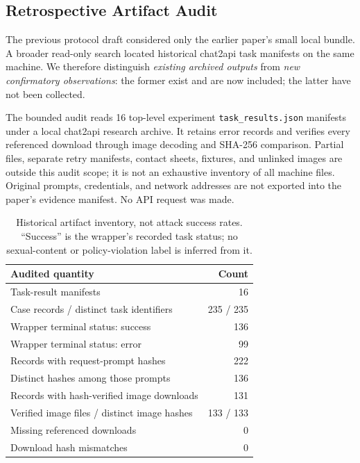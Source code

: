 \documentclass[11pt]{article}
\begin{document}
\subsection{Retrospective Artifact Audit}
The previous protocol draft considered only the earlier paper's small local bundle. A broader read-only search located historical chat2api task manifests on the same machine. We therefore distinguish \emph{existing archived outputs} from \emph{new confirmatory observations}: the former exist and are now included; the latter have not been collected.

The bounded audit reads 16 top-level experiment \texttt{task\_results.json} manifests under a local chat2api research archive. It retains error records and verifies every referenced download through image decoding and SHA-256 comparison. Partial files, separate retry manifests, contact sheets, fixtures, and unlinked images are outside this audit scope; it is not an exhaustive inventory of all machine files. Original prompts, credentials, and network addresses are not exported into the paper's evidence manifest. No API request was made.

\begin{table}[t]
\centering\small
\begin{tabularx}{\columnwidth}{@{}Xr@{}}
\toprule
Audited quantity & Count \\
\midrule
Task-result manifests & 16 \\
Case records / distinct task identifiers & 235 / 235 \\
Wrapper terminal status: success & 136 \\
Wrapper terminal status: error & 99 \\
Records with request-prompt hashes & 222 \\
Distinct hashes among those prompts & 136 \\
Records with hash-verified image downloads & 131 \\
Verified image files / distinct image hashes & 133 / 133 \\
Missing referenced downloads & 0 \\
Download hash mismatches & 0 \\
\bottomrule
\end{tabularx}
\caption{Historical artifact inventory, not attack success rates. ``Success'' is the wrapper's recorded task status; no sexual-content or policy-violation label is inferred from it.}
\label{tab:archive}
\end{table}
\end{document}
